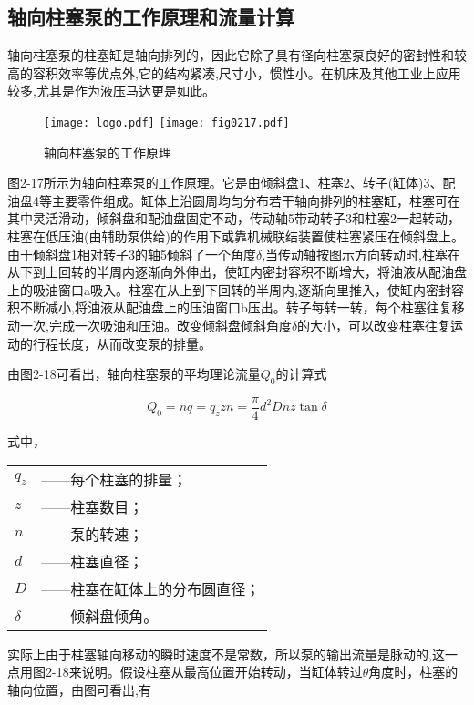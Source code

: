 \subsection{轴向柱塞泵的工作原理和流量计算}

轴向柱塞泵的柱塞缸是轴向排列的，因此它除了具有径向柱塞泵良好的密封性和较高的容积效率等优点外,它的结构紧凑,尺寸小，惯性小。在机床及其他工业上应用较多,尤其是作为液压马达更是如此。

\begin{figure}[!hbt]
\centering
\ifOpenSource
\texttt{[image: logo.pdf]}
\else
\texttt{[image: fig0217.pdf]}
\fi
\caption{轴向柱塞泵的工作原理}
\label{fig:fig0217}
\end{figure}

图2-17所示为轴向柱塞泵的工作原理。它是由倾斜盘1、柱塞2、转子(缸体)3、配油盘4等主要零件组成。缸体上沿圆周均匀分布若干轴向排列的柱塞缸，柱塞可在其中灵活滑动，倾斜盘和配油盘固定不动，传动轴5带动转子3和柱塞2一起转动，柱塞在低压油(由辅助泵供给)的作用下或靠机械联结装置使柱塞紧压在倾斜盘上。由于倾斜盘1相对转子3的轴5倾斜了一个角度$\delta $,当传动轴按图示方向转动时,柱塞在从下到上回转的半周内逐渐向外伸出，使缸内密封容积不断增大，将油液从配油盘上的吸油窗口a吸入。柱塞在从上到下回转的半周内,逐渐向里推入，使缸内密封容积不断减小,将油液从配油盘上的压油窗口b压出。转子每转一转，每个柱塞往复移动一次,完成一次吸油和压油。改变倾斜盘倾斜角度$\delta $的大小，可以改变柱塞往复运动的行程长度，从而改变泵的排量。

由图2-18可看出，轴向柱塞泵的平均理论流量$Q_{0}$的计算式

\begin{equation}
Q_{0}=nq=q_{z}zn=\frac{\pi}{4}d^{2}Dnz\tan \delta  
\end{equation}

\noindent 式中， 
\begin{tabular}[t]{ll}
 $q_{z}$ & ——每个柱塞的排量； \\
 $z$ & ——柱塞数目； \\
 $n$ & ——泵的转速； \\
 $d$ & ——柱塞直径； \\
 $D$ & ——柱塞在缸体上的分布圆直径； \\
 $\delta $ & ——倾斜盘倾角。
\end{tabular}

实际上由于柱塞轴向移动的瞬时速度不是常数，所以泵的输出流量是脉动的,这一点用图2-18来说明。假设柱塞从最高位置开始转动，当缸体转过$\theta $角度时，柱塞的轴向位置，由图可看出,有

